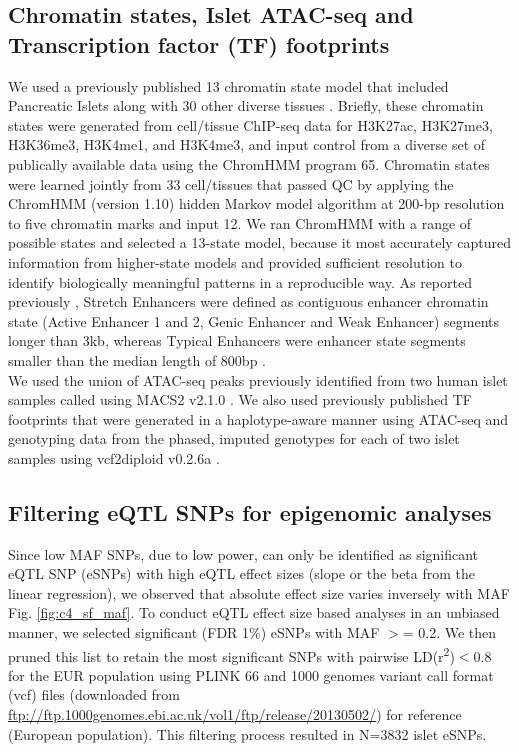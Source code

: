 \subsection{Chromatin states, Islet ATAC-seq and Transcription factor (TF) footprints}
We used a previously published 13 chromatin state model that included Pancreatic Islets along with 30 other diverse tissues \cite{varshneyGeneticRegulatorySignatures2017}. Briefly, these chromatin states were generated from cell/tissue ChIP-seq data for H3K27ac, H3K27me3, H3K36me3, H3K4me1, and H3K4me3, and input control from a diverse set of publically available data \cite{parkerChromatinStretchEnhancer2013, theroadmapepigenomicsconsortiumIntegrativeAnalysis1112015, ernstMappingAnalysisChromatin2011, mikkelsenComparativeEpigenomicAnalysis2010} using the ChromHMM program 65. Chromatin states were learned jointly from 33 cell/tissues that passed QC by applying the ChromHMM (version 1.10) hidden Markov model algorithm at 200-bp resolution to five chromatin marks and input 12. We ran ChromHMM with a range of possible states and selected a 13-state model, because it most accurately captured information from higher-state models and provided sufficient resolution to identify biologically meaningful patterns in a reproducible way. As reported previously \cite{varshneyGeneticRegulatorySignatures2017}, Stretch Enhancers were defined as contiguous enhancer chromatin state (Active Enhancer 1 and 2, Genic Enhancer and Weak Enhancer) segments longer than 3kb, whereas Typical Enhancers were enhancer state segments smaller than the median length of 800bp \cite{parkerChromatinStretchEnhancer2013}. \\

We used the union of ATAC-seq peaks previously identified from two human islet samples called using MACS2 v2.1.0 \cite{varshneyGeneticRegulatorySignatures2017}. We also used previously published TF footprints that were generated in a haplotype-aware manner using ATAC-seq and genotyping data from the phased, imputed genotypes for each of two islet samples using vcf2diploid v0.2.6a \cite{varshneyGeneticRegulatorySignatures2017}.

\subsection{Filtering eQTL SNPs for epigenomic analyses}
Since low MAF SNPs, due to low power, can only be identified as significant eQTL SNP (eSNPs) with high eQTL effect sizes (slope or the beta from the linear regression), we observed that absolute effect size varies inversely with MAF Fig. \ref{fig:c4_sf_maf}. To conduct eQTL effect size based analyses in an unbiased manner, we selected significant (FDR 1\%) eSNPs with MAF $>$= 0.2. We then pruned this list to retain the most significant SNPs with pairwise LD(r\textsuperscript{2})$<$0.8 for the EUR population using PLINK 66 and 1000 genomes variant call format (vcf) files (downloaded from \url{ftp://ftp.1000genomes.ebi.ac.uk/vol1/ftp/release/20130502/}) for reference (European population). This filtering process resulted in N=3832 islet eSNPs.



